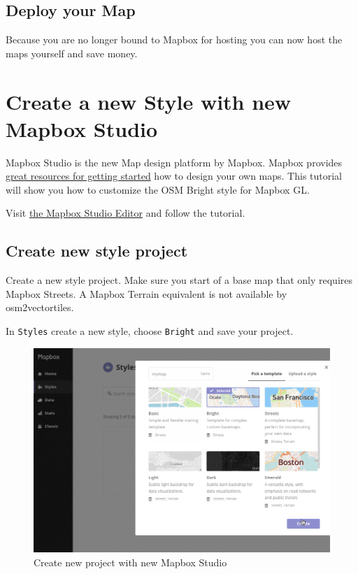 \subsection{Deploy your Map}\label{deploy-your-map}

Because you are no longer bound to Mapbox for hosting you can now host
the maps yourself and save money.


\section{Create a new Style with new Mapbox
Studio}\label{create-a-new-style-with-new-mapbox-studio}

Mapbox Studio is the new Map design platform by Mapbox. Mapbox provides
\href{https://www.mapbox.com/help/getting-started-mapbox-studio-1/}{great
resources for getting started} how to design your own maps. This
tutorial will show you how to customize the OSM Bright style for Mapbox
GL.

Visit \href{https://www.mapbox.com/studio/}{the Mapbox Studio Editor}
and follow the tutorial.

\subsection{Create new style project}\label{create-new-style-project}

Create a new style project. Make sure you start of a base map that only
requires Mapbox Streets. A Mapbox Terrain equivalent is not available by
osm2vectortiles.

In \texttt{Styles} create a new style, choose \texttt{Bright} and save
your project.

\begin{figure}[H]
\centering
\includegraphics[width=1\textwidth]{images/mapbox_studio_create_style.png}
\caption{Create new project with new Mapbox Studio}
\end{figure}

